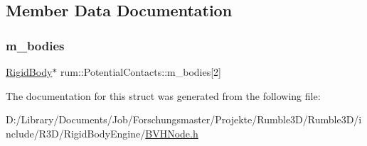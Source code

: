 \subsection{Member Data Documentation}
\mbox{\label{structrum_1_1_potential_contacts_a6c7a15f406ed9bbaeb776bf40e9b15d2}} 
\subsubsection{\texorpdfstring{m\+\_\+bodies}{m\_bodies}}
{\footnotesize\ttfamily \mbox{\hyperlink{classrum_1_1_rigid_body}{Rigid\+Body}}$\ast$ rum\+::\+Potential\+Contacts\+::m\+\_\+bodies\mbox{[}2\mbox{]}}



The documentation for this struct was generated from the following file\+:\begin{DoxyCompactItemize}
\item 
D\+:/\+Library/\+Documents/\+Job/\+Forschungsmaster/\+Projekte/\+Rumble3\+D/\+Rumble3\+D/include/\+R3\+D/\+Rigid\+Body\+Engine/\mbox{\hyperlink{_b_v_h_node_8h}{B\+V\+H\+Node.\+h}}\end{DoxyCompactItemize}
